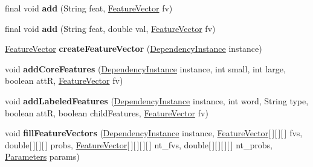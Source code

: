 \begin{DoxyCompactItemize}
\item 
\hypertarget{classmstparser_1_1DependencyPipe_accce7600e50a9c2a6e6a4c4870a1fb66}{
final void {\bfseries add} (String feat, \hyperlink{classmstparser_1_1FeatureVector}{FeatureVector} fv)}
\label{classmstparser_1_1DependencyPipe_accce7600e50a9c2a6e6a4c4870a1fb66}

\item 
\hypertarget{classmstparser_1_1DependencyPipe_ad08b56e61ae8a45f4727a23f117e28c0}{
final void {\bfseries add} (String feat, double val, \hyperlink{classmstparser_1_1FeatureVector}{FeatureVector} fv)}
\label{classmstparser_1_1DependencyPipe_ad08b56e61ae8a45f4727a23f117e28c0}

\item 
\hypertarget{classmstparser_1_1DependencyPipe_a10dc970db3c7ea30b966395aae3272b3}{
\hyperlink{classmstparser_1_1FeatureVector}{FeatureVector} {\bfseries createFeatureVector} (\hyperlink{classmstparser_1_1DependencyInstance}{DependencyInstance} instance)}
\label{classmstparser_1_1DependencyPipe_a10dc970db3c7ea30b966395aae3272b3}

\item 
\hypertarget{classmstparser_1_1DependencyPipe_aa20274a418d473c46ece7d77b8c06c58}{
void {\bfseries addCoreFeatures} (\hyperlink{classmstparser_1_1DependencyInstance}{DependencyInstance} instance, int small, int large, boolean attR, \hyperlink{classmstparser_1_1FeatureVector}{FeatureVector} fv)}
\label{classmstparser_1_1DependencyPipe_aa20274a418d473c46ece7d77b8c06c58}

\item 
\hypertarget{classmstparser_1_1DependencyPipe_ac0dc9ce14772e16752b9364b86d00c9a}{
void {\bfseries addLabeledFeatures} (\hyperlink{classmstparser_1_1DependencyInstance}{DependencyInstance} instance, int word, String type, boolean attR, boolean childFeatures, \hyperlink{classmstparser_1_1FeatureVector}{FeatureVector} fv)}
\label{classmstparser_1_1DependencyPipe_ac0dc9ce14772e16752b9364b86d00c9a}

\item 
\hypertarget{classmstparser_1_1DependencyPipe_a399ebb69f0a5e598353000f377535105}{
void {\bfseries fillFeatureVectors} (\hyperlink{classmstparser_1_1DependencyInstance}{DependencyInstance} instance, \hyperlink{classmstparser_1_1FeatureVector}{FeatureVector}\mbox{[}$\,$\mbox{]}\mbox{[}$\,$\mbox{]}\mbox{[}$\,$\mbox{]} fvs, double\mbox{[}$\,$\mbox{]}\mbox{[}$\,$\mbox{]}\mbox{[}$\,$\mbox{]} probs, \hyperlink{classmstparser_1_1FeatureVector}{FeatureVector}\mbox{[}$\,$\mbox{]}\mbox{[}$\,$\mbox{]}\mbox{[}$\,$\mbox{]}\mbox{[}$\,$\mbox{]} nt\_\-fvs, double\mbox{[}$\,$\mbox{]}\mbox{[}$\,$\mbox{]}\mbox{[}$\,$\mbox{]}\mbox{[}$\,$\mbox{]} nt\_\-probs, \hyperlink{classmstparser_1_1Parameters}{Parameters} params)}
\label{classmstparser_1_1DependencyPipe_a399ebb69f0a5e598353000f377535105}


\end{DoxyCompactItemize}
